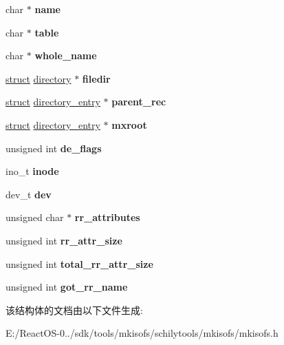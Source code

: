 \begin{DoxyCompactItemize}
\item 
\mbox{\label{structdirectory__entry_a6ec7e3411f56c00676d60e4f8403950a}} 
char $\ast$ {\bfseries name}
\item 
\mbox{\label{structdirectory__entry_a447cdf02bd5310320cb82e04d26cba62}} 
char $\ast$ {\bfseries table}
\item 
\mbox{\label{structdirectory__entry_a077349ccfcbf02fd8ebd51ad0e423ec6}} 
char $\ast$ {\bfseries whole\+\_\+name}
\item 
\mbox{\label{structdirectory__entry_ab893c69e0f6e9cf61452bd1d12ce2d02}} 
\hyperlink{interfacestruct}{struct} \hyperlink{structdirectory}{directory} $\ast$ {\bfseries filedir}
\item 
\mbox{\label{structdirectory__entry_a9a3dcdf793902e60e361bf4c6464c8de}} 
\hyperlink{interfacestruct}{struct} \hyperlink{structdirectory__entry}{directory\+\_\+entry} $\ast$ {\bfseries parent\+\_\+rec}
\item 
\mbox{\label{structdirectory__entry_a3219615f84ce5a02a396a60ed6e4bde9}} 
\hyperlink{interfacestruct}{struct} \hyperlink{structdirectory__entry}{directory\+\_\+entry} $\ast$ {\bfseries mxroot}
\item 
\mbox{\label{structdirectory__entry_a6fa42135635075995a8ef3360019076f}} 
unsigned int {\bfseries de\+\_\+flags}
\item 
\mbox{\label{structdirectory__entry_ab596ce9d2f3e206d1e264bc57df179b3}} 
ino\+\_\+t {\bfseries inode}
\item 
\mbox{\label{structdirectory__entry_a0cbc7b66d66780072ef6c5560e5096f4}} 
dev\+\_\+t {\bfseries dev}
\item 
\mbox{\label{structdirectory__entry_a46f17c20e978d3ea05bf648b09dae388}} 
unsigned char $\ast$ {\bfseries rr\+\_\+attributes}
\item 
\mbox{\label{structdirectory__entry_a3df755c7efbe0d91672f2d4c3be79696}} 
unsigned int {\bfseries rr\+\_\+attr\+\_\+size}
\item 
\mbox{\label{structdirectory__entry_ae7868612c5025b35e7ad8cec22fb3ded}} 
unsigned int {\bfseries total\+\_\+rr\+\_\+attr\+\_\+size}
\item 
\mbox{\label{structdirectory__entry_a16fb501db6aed98c068dd7206be8dca2}} 
unsigned int {\bfseries got\+\_\+rr\+\_\+name}
\end{DoxyCompactItemize}


该结构体的文档由以下文件生成\+:\begin{DoxyCompactItemize}
\item 
E\+:/\+React\+O\+S-\/0../sdk/tools/mkisofs/schilytools/mkisofs/mkisofs.\+h\end{DoxyCompactItemize}
